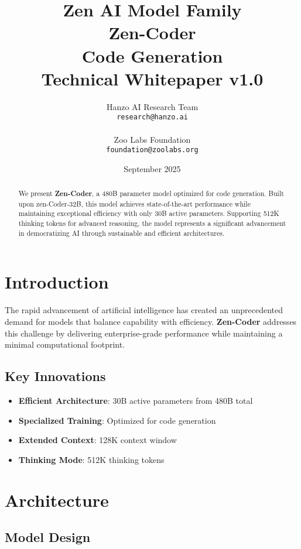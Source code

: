 \documentclass[11pt,a4paper]{article}
\title{
    \vspace{-2cm}
    \Large \textbf{Zen AI Model Family} \\
    \vspace{0.5cm}
    \Huge \textbf{Zen-Coder} \\
    \vspace{0.3cm}
    \large Code Generation \\
    \vspace{0.5cm}
    \normalsize Technical Whitepaper v1.0
}
\author{
    Hanzo AI Research Team \\
    \texttt{research@hanzo.ai} \\
    \\
    Zoo Labs Foundation \\
    \texttt{foundation@zoolabs.org}
}
\date{September 2025}
\begin{document}
\maketitle

\begin{abstract}
We present \textbf{Zen-Coder}, a 480B parameter model optimized for code generation. 
Built upon zen-Coder-32B, this model achieves state-of-the-art performance while maintaining exceptional efficiency 
with only 30B active parameters. Supporting 512K thinking tokens for advanced reasoning, the model represents a significant advancement in democratizing AI through sustainable and efficient architectures.
\end{abstract}

\tableofcontents
\newpage

\section{Introduction}

The rapid advancement of artificial intelligence has created an unprecedented demand for models that balance capability with efficiency. 
\textbf{Zen-Coder} addresses this challenge by delivering enterprise-grade performance while maintaining a minimal computational footprint.

\subsection{Key Innovations}
\begin{itemize}
    \item \textbf{Efficient Architecture}: 30B active parameters from 480B total
    \item \textbf{Specialized Training}: Optimized for code generation
    \item \textbf{Extended Context}: 128K context window
    \item \textbf{Thinking Mode}: 512K thinking tokens
    
    
\end{itemize}

\section{Architecture}

\subsection{Model Design}
\end{document}
